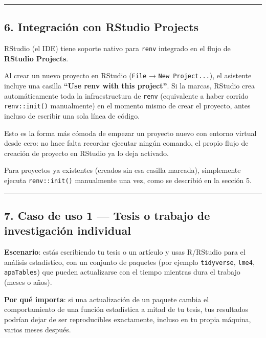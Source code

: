 \documentclass[
  man,
  floatsintext,
  longtable,
  a4paper,
  nolmodern,
  notxfonts,
  notimes,
  12pt,
  colorlinks=true,linkcolor=blue,citecolor=blue,urlcolor=blue]{apa7}
\begin{document}
\begin{center}\rule{0.5\linewidth}{0.5pt}\end{center}

\subsection{6. Integración con RStudio
Projects}\label{integraciuxf3n-con-rstudio-projects}

RStudio (el IDE) tiene soporte nativo para \texttt{renv} integrado en el
flujo de \textbf{RStudio Projects}.

Al crear un nuevo proyecto en RStudio (\texttt{File} →
\texttt{New\ Project...}), el asistente incluye una casilla
\textbf{``Use renv with this project''}. Si la marcas, RStudio crea
automáticamente toda la infraestructura de \texttt{renv} (equivalente a
haber corrido \texttt{renv::init()} manualmente) en el momento mismo de
crear el proyecto, antes incluso de escribir una sola línea de código.

Esto es la forma más cómoda de empezar un proyecto nuevo con entorno
virtual desde cero: no hace falta recordar ejecutar ningún comando, el
propio flujo de creación de proyecto en RStudio ya lo deja activado.

Para proyectos ya existentes (creados sin esa casilla marcada),
simplemente ejecuta \texttt{renv::init()} manualmente una vez, como se
describió en la sección 5.

\begin{center}\rule{0.5\linewidth}{0.5pt}\end{center}

\subsection{7. Caso de uso 1 --- Tesis o trabajo de investigación
individual}\label{caso-de-uso-1-tesis-o-trabajo-de-investigaciuxf3n-individual}

\textbf{Escenario}: estás escribiendo tu tesis o un artículo y usas
R/RStudio para el análisis estadístico, con un conjunto de paquetes (por
ejemplo \texttt{tidyverse}, \texttt{lme4}, \texttt{apaTables}) que
pueden actualizarse con el tiempo mientras dura el trabajo (meses o
años).

\textbf{Por qué importa}: si una actualización de un paquete cambia el
comportamiento de una función estadística a mitad de tu tesis, tus
resultados podrían dejar de ser reproducibles exactamente, incluso en tu
propia máquina, varios meses después.
\end{document}
